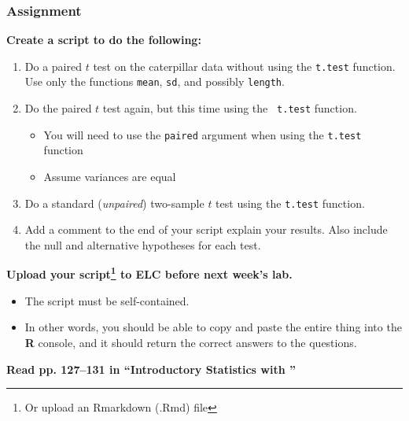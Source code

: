\documentclass[color=usenames,dvipsnames]{beamer}\usepackage[]{graphicx}\usepackage[]{color}
\begin{document}







\begin{frame}
  \frametitle{Assignment}
  \footnotesize
  {\bf Create a script to do the following:}
  \begin{enumerate}[\bf (1)]
    \item Do a paired $t$ test on the caterpillar data without using the {\tt t.test}
      function. Use only the functions {\tt mean}, {\tt sd}, and
      possibly {\tt length}.
    \item Do the paired $t$ test again, but this time using the {\tt
        t.test} function.
      \begin{itemize}
        \scriptsize
        \item You will need to use the {\tt paired} argument when using the {\tt t.test} function
        \item Assume variances are equal
      \end{itemize}
    \item Do a standard ({\it unpaired}) two-sample $t$ test using
      the {\tt t.test} function.
    \item Add a comment to the end of your script explain your
      results. Also include the null and alternative hypotheses for
      each test. %
  \end{enumerate}
  \vfill
  {\bf Upload your script\footnote{\scriptsize Or upload an Rmarkdown
      (.Rmd) file} to ELC before next week's lab.}
  \begin{itemize}
    \item The script must be self-contained.
    \item In other words, you should be able to copy and paste the
      entire thing into the {\bf R} console, and it should return the
      correct answers to the questions.
  \end{itemize}
  \vfill
   {\bf Read pp. 127--131 in ``Introductory Statistics with \R''}
\end{frame}
\end{document}
